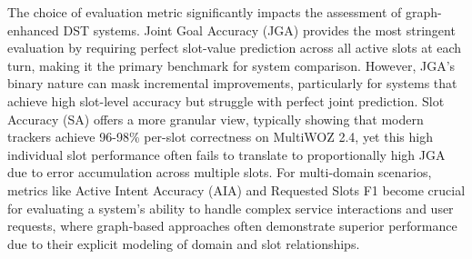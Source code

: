 \documentclass[11pt]{article}
\begin{document}
The choice of evaluation metric significantly impacts the assessment of graph-enhanced DST systems. Joint Goal Accuracy (JGA) provides the most stringent evaluation by requiring perfect slot-value prediction across all active slots at each turn, making it the primary benchmark for system comparison. However, JGA's binary nature can mask incremental improvements, particularly for systems that achieve high slot-level accuracy but struggle with perfect joint prediction. Slot Accuracy (SA) offers a more granular view, typically showing that modern trackers achieve 96-98\% per-slot correctness on MultiWOZ 2.4, yet this high individual slot performance often fails to translate to proportionally high JGA due to error accumulation across multiple slots. For multi-domain scenarios, metrics like Active Intent Accuracy (AIA) and Requested Slots F1 become crucial for evaluating a system's ability to handle complex service interactions and user requests, where graph-based approaches often demonstrate superior performance due to their explicit modeling of domain and slot relationships.
\end{document}
